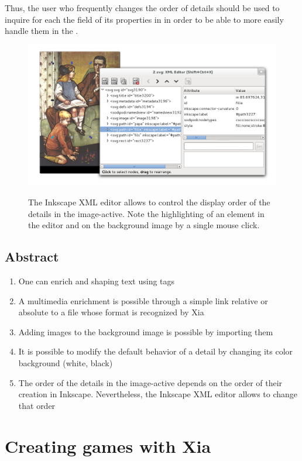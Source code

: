 Thus, the user who frequently changes the order of details should be used to inquire for each the field  of its properties in in order to be able to more easily handle them in the .


\begin{figure}[htp]
 \centering
 \caption{The Inkscape XML editor allows to control the display order of the details in the image-active. Note the highlighting of an element  
in the editor and on the background image by a single mouse click.}
 \includegraphics[width=\textwidth]{images/ordre_couches}
 \label{ordre_couches}
\end{figure}

\subsection{Abstract}

\begin{enumerate}
 \item One can enrich and shaping text using tags
 \item A multimedia enrichment is possible through a simple link relative
or absolute to a file whose format is recognized by Xia
 \item Adding images to the background image is possible by importing them
 \item It is possible to modify the default behavior of a detail by changing its color 
background (white, black)
 \item The order of the details in the image-active depends on the order
of their creation in Inkscape. Nevertheless, the Inkscape XML editor allows to change that order
\end{enumerate}


\section{Creating games with Xia}

